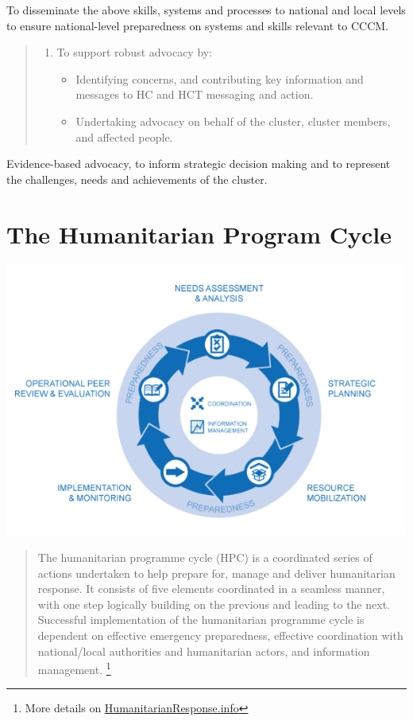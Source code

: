 \documentclass[
  a4paper,
  onecolumn,
  oneside]{book}
\providecommand{\tightlist}{%
  \setlength{\itemsep}{0pt}\setlength{\parskip}{0pt}}\usepackage{longtable,booktabs,array}
\begin{document}
To disseminate the above skills, systems and processes to national and
local levels to ensure national-level preparedness on systems and skills
relevant to CCCM.

\begin{quote}
\begin{enumerate}
\def\labelenumi{\arabic{enumi}.}
\setcounter{enumi}{5}
\tightlist
\item
  To support robust advocacy by:

  \begin{itemize}
  \tightlist
  \item
    Identifying concerns, and contributing key information and messages
    to HC and HCT messaging and action.
  \item
    Undertaking advocacy on behalf of the cluster, cluster members, and
    affected people.
  \end{itemize}
\end{enumerate}
\end{quote}

Evidence-based advocacy, to inform strategic decision making and to
represent the challenges, needs and achievements of the cluster.

\hypertarget{the-humanitarian-program-cycle}{%
\section{The Humanitarian Program
Cycle}\label{the-humanitarian-program-cycle}}

\includegraphics{part3/images/HPCcycle.png}

\begin{quote}
The humanitarian programme cycle (HPC) is a coordinated series of
actions undertaken to help prepare for, manage and deliver humanitarian
response. It consists of five elements coordinated in a seamless manner,
with one step logically building on the previous and leading to the
next. Successful implementation of the humanitarian programme cycle is
dependent on effective emergency preparedness, effective coordination
with national/local authorities and humanitarian actors, and information
management. \footnote{More details on
  \href{https://www.humanitarianresponse.info/en/programme-cycle/space}{HumanitarianResponse.info}}
\end{quote}
\end{document}
